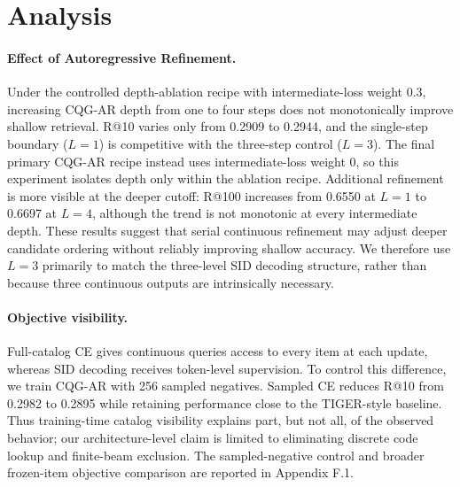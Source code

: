 \documentclass[letterpaper]{article}
\begin{document}
\section{Analysis}

\paragraph{Effect of Autoregressive Refinement.}
Under the controlled depth-ablation recipe with intermediate-loss weight 0.3,
increasing CQG-AR depth from one to four steps does not monotonically improve
shallow retrieval. R@10 varies only from 0.2909 to 0.2944, and the single-step
boundary ($L=1$) is competitive with the three-step control ($L=3$).
The final primary CQG-AR recipe instead uses intermediate-loss weight 0, so
this experiment isolates depth only within the ablation recipe. Additional refinement is more visible at the deeper cutoff:
R@100 increases from 0.6550 at $L=1$ to 0.6697 at $L=4$, although the trend is
not monotonic at every intermediate depth. These results suggest that serial
continuous refinement may adjust deeper candidate ordering without reliably
improving shallow accuracy. We therefore use $L=3$ primarily to match the
three-level SID decoding structure, rather than because three continuous
outputs are intrinsically necessary.

\paragraph{Objective visibility.}
Full-catalog CE gives continuous queries access to every item at each update,
whereas SID decoding receives token-level supervision. To control this
difference, we train CQG-AR with 256 sampled negatives. Sampled CE reduces
R@10 from 0.2982 to 0.2895 while retaining performance close to the
TIGER-style baseline. Thus training-time catalog visibility explains part,
but not all, of the observed behavior; our architecture-level claim is
limited to eliminating discrete code lookup and finite-beam exclusion.
The sampled-negative control and broader frozen-item objective comparison are
reported in Appendix F.1.

\end{document}
